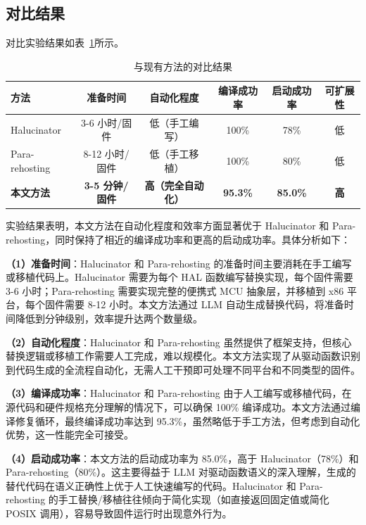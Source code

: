 \subsection{对比结果}

对比实验结果如表~\ref{tab:compare_results}所示。

\begin{table}[htbp]
\centering
\caption{与现有方法的对比结果}
\label{tab:compare_results}
\small
\begin{tabular}{lccccc}
\toprule
\textbf{方法} & \textbf{准备时间} & \textbf{自动化程度} & \textbf{编译成功率} & \textbf{启动成功率} & \textbf{可扩展性} \\
\midrule
Halucinator & 3-6 小时/固件 & 低（手工编写） & 100\% & 78\% & 低 \\
Para-rehosting & 8-12 小时/固件 & 低（手工移植） & 100\% & 80\% & 低 \\
\textbf{本文方法} & \textbf{3-5 分钟/固件} & \textbf{高（完全自动化）} & \textbf{95.3\%} & \textbf{85.0\%} & \textbf{高} \\
\bottomrule
\end{tabular}
\end{table}

实验结果表明，本文方法在自动化程度和效率方面显著优于 Halucinator 和 Para-rehosting，同时保持了相近的编译成功率和更高的启动成功率。具体分析如下：

\textbf{（1）准备时间}：Halucinator 和 Para-rehosting 的准备时间主要消耗在手工编写或移植代码上。Halucinator 需要为每个 HAL 函数编写替换实现，每个固件需要 3-6 小时；Para-rehosting 需要实现完整的便携式 MCU 抽象层，并移植到 x86 平台，每个固件需要 8-12 小时。本文方法通过 LLM 自动生成替换代码，将准备时间降低到分钟级别，效率提升达两个数量级。

\textbf{（2）自动化程度}：Halucinator 和 Para-rehosting 虽然提供了框架支持，但核心替换逻辑或移植工作需要人工完成，难以规模化。本文方法实现了从驱动函数识别到代码生成的全流程自动化，无需人工干预即可处理不同平台和不同类型的固件。

\textbf{（3）编译成功率}：Halucinator 和 Para-rehosting 由于人工编写或移植代码，在源代码和硬件规格充分理解的情况下，可以确保 100\% 编译成功。本文方法通过编译修复循环，最终编译成功率达到 95.3\%，虽然略低于手工方法，但考虑到自动化优势，这一性能完全可接受。

\textbf{（4）启动成功率}：本文方法的启动成功率为 85.0\%，高于 Halucinator（78\%）和 Para-rehosting（80\%）。这主要得益于 LLM 对驱动函数语义的深入理解，生成的替代代码在语义正确性上优于人工快速编写的代码。Halucinator 和 Para-rehosting 的手工替换/移植往往倾向于简化实现（如直接返回固定值或简化 POSIX 调用），容易导致固件运行时出现意外行为。

